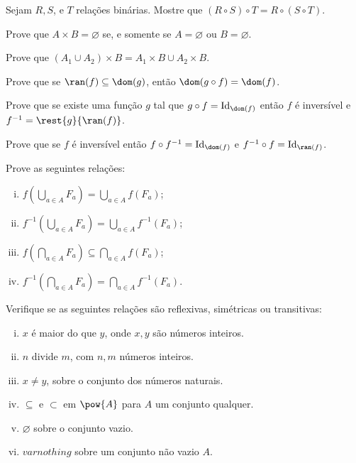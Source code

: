 \documentclass[a4paper]{article}
\begin{document}
\begin{exercicio}
  Sejam \(R,S\), e \(T\) relações binárias. Mostre que
  \((R\circ S)\circ T= R\circ (S\circ T)\).
\end{exercicio}
\begin{exercicio}
Prove que \(A\times B=\varnothing\) se, e somente se \(A=\varnothing\) ou \(B=\varnothing\).
\end{exercicio}
\begin{exercicio}
Prove que \((A_1\cup A_2)\times B=A_1\times B\cup A_2\times B.\) 
\end{exercicio}
\begin{exercicio}
 Prove que se \(\ran (f)\subseteq \dom (g)\), então \(\dom (g\circ f) = \dom (f)\).
\end{exercicio}
\begin{exercicio}
Prove que se existe uma função \(g\) tal que \(g\circ f = \text{Id}_{\dom (f)}\)
então \(f\) é inversível e \(f^{-1}=\rest{g}{\ran (f)}\).  
\end{exercicio}
\begin{exercicio}
 Prove que se \(f\) é inversível então \(f\circ f^{-1}=\text{Id}_{\dom (f)}\) e
 \(f^{-1}\circ f = \text{Id}_{\ran (f)}\).
\end{exercicio}
\begin{exercicio}
  Prove as seguintes relações:
  \begin{enumerate}[(i)]
  \item \(f(\bigcup_{a\in A} F_a)=\bigcup_{a\in A} f(F_a)\);
   \item  \(f^{-1}(\bigcup_{a\in A} F_a)=\bigcup_{a\in A}f^{-1}(F_a)\);
   \item \(f(\bigcap_{a\in A}F_a)\subseteq \bigcap_{a\in A}f(F_a)\);
    \item \( f^{-1}(\bigcap_{a\in A} F_a)=\bigcap_{a\in A}f^{-1}(F_a) \).
   \end{enumerate}
 \end{exercicio}
 \begin{exercicio}
   Verifique se as seguintes relações são reflexivas, simétricas ou transitivas:
   \begin{enumerate}[(i)]
   \item \(x\) é maior do que \(y\), onde \(x,y\) são números inteiros.
    \item \(n\) divide \(m\), com \(n,m\) números inteiros.
    \item \(x\not = y\), sobre o conjunto dos números naturais.
     \item \(\subseteq\) e \(\subset\) em \(\pow{A}\) para \(A\) um conjunto qualquer.
     \item \(\varnothing\) sobre o conjunto vazio.
      \item \(varnothing\) sobre um conjunto não vazio \(A\).
     \end{enumerate}
   \end{exercicio}
\end{document}
